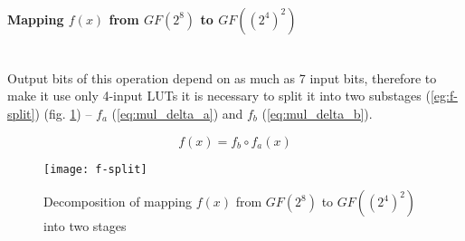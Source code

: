 \paragraph{Mapping $f(x)$ from $GF(2^8)$ to $GF((2^4)^2)$}\mbox{}\\
Output bits of this operation depend on as much as 7 input bits, therefore to make it use only 4-input LUTs it is necessary to split it into two substages (\ref{eg:f-split}) (fig. \ref{fig:f-split}) -- $f_a$ (\ref{eq:mul_delta_a}) and $f_b$ (\ref{eq:mul_delta_b}).

\begin{equation}
\label{eg:f-split}
f(x) = f_b \circ f_a(x)
\end{equation}

\begin{figure}[!h]
\centering
\texttt{[image: f-split]}
\caption{Decomposition of mapping $f(x)$ from $GF(2^8)$ to $GF((2^4)^2)$ into two stages}
\label{fig:f-split}
\end{figure}


